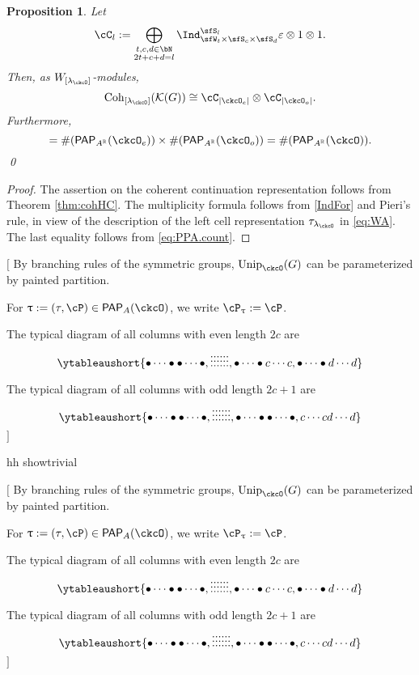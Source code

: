 \documentclass[12pt,a4paper]{amsart}
\let\ytb=\ytableaushort
\newcommand{\trivial}[2][]{\if\relax\detokenize{#1}\relax
  {%
      \color{orange} \vspace{0em} $[$  #2 $]$
      \color{black}
  }
  \else
\ifx#1h
\ifcsname showtrivial\endcsname
{%
    \color{orange} \vspace{0em}  $[$ #2 $]$
    \color{black}
}
\fi
\else {\red Wrong argument!} \fi
\fi
}
\def\abs#1{\left|{#1}\right|}
\newcommand{\CK}{{\mathcal {K}}}
\newcommand{\sgn}{\operatorname{sgn}}
\newcommand{\R}{\mathbb R}
\numberwithin{equation}{section}
\newtheorem{prop}[thm]{Proposition}
\theoremstyle{remark}
\def\Unip{\mathrm{Unip}}
\def\lamck{\lambda_\ckcO}
\def\Wint#1{W_{[#1]}}
\def\Cint#1{\Coh_{[#1]}}
\def\PP{\mathsf{PAP}}
\def\Coh{\mathrm{Coh}}
\begin{document}
\begin{prop} \label{lem:GL.count}
  Let
  \[
    \cC_l := \bigoplus_{\substack{t,c,d\in \bN \\2t+c+d=l}} \Ind_{\sfW_t\times \sfS_c\times \sfS_d}^{\sfS_{l}} \varepsilon \otimes 1\otimes 1.
  \]
  Then, as $W_{[\lamck]}$-modules,
  \[
    \Cint{\lamck}(\CK(G)) \cong \cC_{\abs{\ckcO_{e}}}\otimes \cC_{\abs{\ckcO_{o}}}.
  \]
  Furthermore,
  \begin{equation*}%
    [\tau_{\lamck}: \Cint{\lamck}(\CK(G))] = \# (\PP_{A^\R}(\ckcO_{e}))\times
    \# (\PP_{A^\R}(\ckcO_{o})) = \# (\PP_{A^\R}(\ckcO)).
  \end{equation*}
  \qed
\end{prop}
\begin{proof}
  The assertion on the coherent continuation representation follows from Theorem \ref{thm:cohHC}.
  The multiplicity formula follows from \eqref{IndFor} and Pieri's rule, in view of the description of the left cell representation $\tau_{\lamck}$ in \eqref{eq:WA}.  The last equality
  follows from \eqref{eq:PPA.count}.
\end{proof}

\trivial[h]{
By branching rules of the symmetric groups, $\Unip_{\ckcO}(G)$ can be
parameterized by painted partition.

For $\uptau:=(\tau,\cP)\in \PP_{A}(\ckcO)$, we write $\cP_{\uptau}:= \cP$.

  The typical diagram of all columns with even length $2c$ are
  \[
    \ytb{\bullet\cdots\bullet\bullet\cdots\bullet,\vdots\vdots\vdots\vdots\vdots\vdots, \bullet\cdots\bullet c\cdots c, \bullet\cdots\bullet d\cdots d }
  \]

  The typical diagram of all columns with odd length $2c+1$ are
  \[
    \ytb{\bullet\cdots\bullet\bullet\cdots\bullet,\vdots\vdots\vdots\vdots\vdots\vdots, \bullet\cdots\bullet \bullet\cdots\bullet , c\cdots c d\cdots d }
  \]
}
\end{document}
